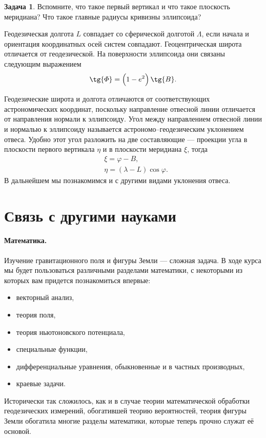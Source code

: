 \documentclass[11pt, a4paper]{article}
\theoremstyle{plain}
\theoremstyle{definition}
\newtheorem{problem}{Задача}[section]
\theoremstyle{remark}
\renewcommand{\phi}{\ensuremath{\varphi}}
\begin{document}
\begin{problem}
    Вспомните, что такое первый вертикал и что такое плоскость меридиана? Что такое главные радиусы
    кривизны эллипсоида?
\end{problem}

Геодезическая долгота $L$ совпадает со сферической
долготой $\Lambda$, если начала и ориентация координатных осей систем совпадают. 
Геоцентрическая широта отличается от геодезической. На поверхности эллипсоида они связаны следующим
выражением
\begin{equation*}
    \tg{\Phi} = \left( 1 - e^2 \right)\tg{B}.
\end{equation*}

Геодезические широта и долгота отличаются от соответствующих астрономических координат, поскольку
направление отвесной линии отличается от направления нормали к эллипсоиду. Угол между направлением
отвесной линии и нормалью к эллипсоиду называется астрономо--геодезическим уклонением отвеса.
Удобно этот угол разложить на две составляющие --- проекции угла в плоскости первого вертикала
$\eta$  и в плоскости меридиана $\xi$, тогда
\begin{align*}
    &\xi = \phi - B,\\
    &\eta = \left( \lambda - L \right)\cos\phi.
\end{align*}
В дальнейшем мы познакомимся и с другими видами уклонения отвеса.

\section{Связь с другими науками}
\paragraph{Математика.}
Изучение гравитационного поля и фигуры Земли --- сложная задача. В ходе курса мы будет пользоваться
различными разделами математики, с некоторыми из которых вам придется познакомиться впервые:
\begin{itemize}
    \item векторный анализ,
    \item теория поля,
    \item теория ньютоновского потенциала,
    \item специальные функции,
    \item дифференциальные уравнения, обыкновенные и в частных производных,
    \item краевые задачи.
\end{itemize}
Исторически так сложилось, как и в случае теории математической обработки геодезических
измерений, обогатившей теорию вероятностей, теория фигуры Земли обогатила многие разделы математики,
которые теперь прочно служат её основой.
\end{document}
